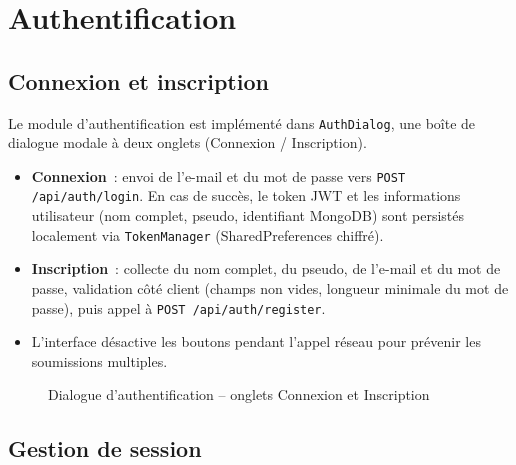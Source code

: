 \documentclass[12pt, a4paper]{report}
\begin{document}
\section{Authentification}

\subsection{Connexion et inscription}

Le module d'authentification est implémenté dans \texttt{AuthDialog}, une boîte de dialogue
modale à deux onglets (Connexion / Inscription).

\begin{itemize}
  \item \textbf{Connexion}~: envoi de l'e-mail et du mot de passe vers \texttt{POST /api/auth/login}.
        En cas de succès, le token JWT et les informations utilisateur (nom complet,
        pseudo, identifiant MongoDB) sont persistés localement via \texttt{TokenManager}
        (SharedPreferences chiffré).
  \item \textbf{Inscription}~: collecte du nom complet, du pseudo, de l'e-mail et du mot de
        passe, validation côté client (champs non vides, longueur minimale du mot de passe),
        puis appel à \texttt{POST /api/auth/register}.
  \item L'interface désactive les boutons pendant l'appel réseau pour prévenir les
        soumissions multiples.
\end{itemize}

\begin{figure}[H]
  \centering
  \caption{Dialogue d'authentification -- onglets Connexion et Inscription}
  \label{fig:auth}
\end{figure}

\subsection{Gestion de session}
\end{document}
